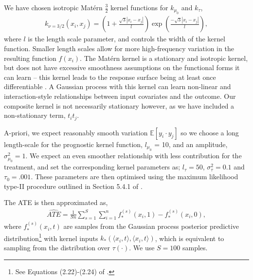 \documentclass[12pt, a4paper]{article}
\begin{document}
We have chosen isotropic Mat\'{e}rn $\frac{3}{2}$ kernel functions for
$k_{\mu_0}$ and $k_\tau$, 
\begin{align*}
  k_{\nu=3/2}(x_i, x_j) = 
    \left(1 + \frac{\sqrt{3}|x_i - x_j|}{l} \right)
    \exp\left(\frac{-\sqrt{3}|x_i - x_j|}{l}\right),
\end{align*}
where $l$ is the length scale parameter, and controls the width of the kernel
function. Smaller length scales allow for more high-frequency variation in the
resulting function $f(x_i)$. The Mat\'{e}rn kernel is a stationary and
isotropic kernel, but does not have excessive smoothness assumptions on the
functional forms it can learn -- this kernel leads to the response surface
being at least once differentiable \citep{williams2006}. A Gaussian process
with this kernel can learn non-linear and interaction-style relationships
between input covariates and the outcome. Our composite kernel is not
necessarily stationary however, as we have included a non-stationary term, $t_i
t_j$. 

A-priori, we expect reasonably smooth variation $\mathbb{E}[y_i \cdot y_j]$ so
we choose a long length-scale for the prognostic kernel function, $l_{\mu_0}$ =
10, and an amplitude, $\sigma^2_{\mu_0} = 1$. We expect an even smoother
relationship with less contribution for the treatment, and set the
corresponding kernel parameters as; $l_\tau = 50$, $\sigma^2_\tau = 0.1$ and
$\tau_0 = .001$. These parameters are then optimised using the maximum
likelihood type-II procedure outlined in Section 5.4.1 of \citet{williams2006}.

The ATE is then approximated as,
\begin{align*}
  \hat{ATE} = \frac{1}{Sn} \sum^S_{s=1}\sum^n_{i=1}
    f^{(s)}_*(x_i, 1) - f^{(s)}_*(x_i, 0),
\end{align*}
where $f^{(s)}_*(x_i, t)$ are samples from the Gaussian process posterior
predictive distribution\footnote{See Equations (2.22)-(2.24)
of \citet{williams2006}.} with kernel inputs $k_*(\langle x_i, t \rangle, \langle x_i, t
\rangle)$, which is equivalent to sampling from the distribution over
$\tau(\cdot)$. We use $S=100$ samples.
\end{document}
